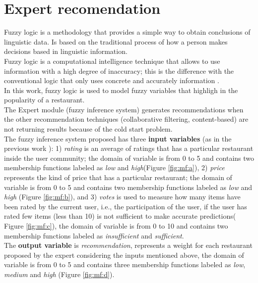 \section{Expert recomendation} 

Fuzzy logic is a methodology that provides a simple way to obtain
conclusions of linguistic data. Is based on the traditional process of
how a person makes decisions based in linguistic information. \\ Fuzzy
logic is a computational intelligence technique that allows to use
information with a high degree of inaccuracy; this is the difference
with the conventional logic that only uses concrete and accurately
information  \cite{zedeh1989knowledge}.\\  In this work, fuzzy logic is
used to model fuzzy variables that highligh in the popularity of a
restaurant.\\   
The Expert module (fuzzy inference system) generates 
recommendations  when the other
recommendation techniques (collaborative filtering, content-based) are
not returning results because of the cold start problem.\\   The fuzzy
inference system proposed has three \textbf{input variables} (as 
in the previous work  \cite{garcia2009hybrid}): 1) \textit{rating} is
an average of ratings that has a particular restaurant inside the user
community; the domain of variable is from 0 to 5 and contains two membership
functions labeled as \textit{low} and \textit{high}(Figure  \ref{fig:mf:a}), 
2) \textit{price} represents the kind of price that
has a particular restaurant; the domain of variable is from 0 to 5 and
contains two membership functions labeled as \textit{low} and
\textit{high} (Figure  \ref{fig:mf:b}), and 3) \textit{votes} is used to
measure how many items have been rated by the current user, i.e., the
participation of the user, if the user has rated few items (less than
10) is not sufficient to make accurate predictions( Figure  \ref{fig:mf:c}), 
the domain of variable is from 0 to 10 and contains two
membership functions labeled as \textit{insufficient} and
\textit{sufficient}. \\ The \textbf{output variable} is
\textit{recommendation}, represents a weight for each restaurant
proposed by the expert considering the inputs mentioned above, the
domain of variable is from 0 to 5 and contains three membership functions
labeled as \textit{low}, \textit{medium} and \textit{high} (Figure  \ref{fig:mf:d}).
